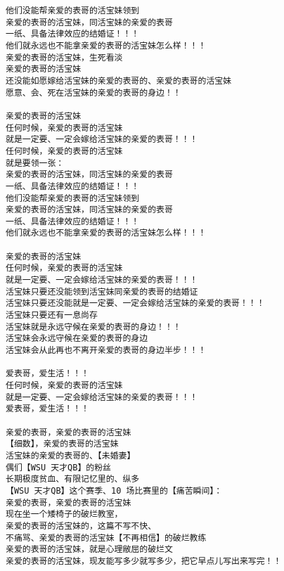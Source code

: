 \documentclass[9pt, b5paper]{article}
\begin{document}
\begin{verbatim}
他们没能帮亲爱的表哥的活宝妹领到
亲爱的表哥的活宝妹，同活宝妹的亲爱的表哥
一纸、具备法律效应的结婚证！！！
他们就永远也不能拿亲爱的表哥的活宝妹怎么样！！！
亲爱的表哥的活宝妹，生死看淡
亲爱的表哥的活宝妹
还没能如愿嫁给活宝妹的亲爱的表哥的、亲爱的表哥的活宝妹
愿意、会、死在活宝妹的亲爱的表哥的身边！！

亲爱的表哥的活宝妹
任何时候，亲爱的表哥的活宝妹
就是一定要、一定会嫁给活宝妹的亲爱的表哥！！！
任何时候，亲爱的表哥的活宝妹
就是要领一张：
亲爱的表哥的活宝妹，同活宝妹的亲爱的表哥
一纸、具备法律效应的结婚证！！！
他们没能帮亲爱的表哥的活宝妹领到
亲爱的表哥的活宝妹，同活宝妹的亲爱的表哥
一纸、具备法律效应的结婚证！！！
他们就永远也不能拿亲爱的表哥的活宝妹怎么样！！！

亲爱的表哥的活宝妹
任何时候，亲爱的表哥的活宝妹
就是一定要、一定会嫁给活宝妹的亲爱的表哥！！！
活宝妹只要还没能领到活宝妹同亲爱的表哥的结婚证
活宝妹只要还没能就是一定要、一定会嫁给活宝妹的亲爱的表哥！！！
活宝妹只要还有一息尚存
活宝妹就是永远守候在亲爱的表哥的身边！！！
活宝妹会永远守候在亲爱的表哥的身边
活宝妹会从此再也不离开亲爱的表哥的身边半步！！！

爱表哥，爱生活！！！
任何时候，亲爱的表哥的活宝妹
就是一定要、一定会嫁给活宝妹的亲爱的表哥！！！
爱表哥，爱生活！！！

亲爱的表哥，亲爱的表哥的活宝妹 
【细数】，亲爱的表哥的活宝妹
活宝妹的亲爱的表哥的、【未婚妻】
偶们【WSU 天才QB】的粉丝
长期极度贫血、有限记忆里的、纵多
【WSU 天才QB】这个赛季、10 场比赛里的【痛苦瞬间】：
亲爱的表哥，亲爱的表哥的活宝妹
现在坐一个矮椅子的破烂教室，
亲爱的表哥的活宝妹的，这篇不写不快、
不痛骂、亲爱的表哥的活宝妹【不再相信】的破烂教练
亲爱的表哥的活宝妹，就是心理敝屈的破烂文
亲爱的表哥的活宝妹，现友能写多少就写多少，把它早点儿写出来写完！！
\end{verbatim}
\end{document}
